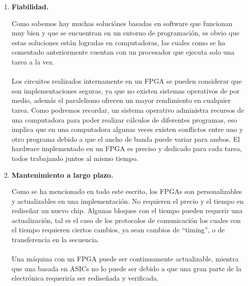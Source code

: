 \documentclass[twoside,spanish,ESP,MSc]{plantillaLabUPV}
\theoremstyle{definition}
\newcommand{\f}{FPGA }
\newcommand{\fs}{FPGAs }
\begin{document}
\begin{enumerate}
De primera mano comparar el precio de costo de fabricación de un ASIC contra la de un \f comercial es total mente diferente. Para un ASIC se requieren varios ingenieros tanto para desarrollar la arquitectura interna como su manufactura. Las soluciones basadas en \fs son bastante simples ya que en una primera parte solamente se necesita la ingeniería detrás de la arquitectura del IC, sin tener que gastar aun en la manufactura. Una vez refinado por completo el modelo puede ser manufacturado, esto puede ahorrar bastante en scrap realizado en pruebas. \\\\Los fabricantes de ICs por lo general hacen lo contrario, sin embargo la fuerte inversión inicial es justificable al manufacturar miles de chips que se venden por año. Por otra parte si solo se necesitan algunos cuantos ICs de un solo tipo un \f puede resultar en una solución abismalmente más barata.\\


\item \textbf{Fiabilidad.}

Como sabemos hay muchas soluciónes basadas en software que funcionan muy bien y que se encuentran en un entorno de programación, es obvio que estas soluciones están logradas en computadoras, las cuales como se ha comentado anteriormente cuentan con un procesador que ejecuta solo una tarea a la vez. \\\\
Los circuitos realizados internamente en un \f se pueden considerar que son implementaciones seguras, ya que no existen sistemas operativos de por medio, además el paralelismo ofrecen un mayor rendimiento en cualquier tarea. Como podremos recordar, un sistema operativo administra recursos de una computadora para poder realizar cálculos de diferentes programas, eso implica que en una computadora algunas veces existen conflictos entre uno y otro programa debido a que el ancho de banda puede variar para ambos. El hardware implementado en un \f es preciso y dedicado para cada tarea, todos trabajando juntos al mismo tiempo. \\

\item \textbf{Mantenimiento a largo plazo.}

Como se ha mencionado en todo este escrito, los \fs son personalizables y actualizables en una implementación. No requieren el precio y el tiempo en rediseñar un nuevo chip. Algunas bloques con el tiempo pueden requerir una actualización, tal es el caso de los protocolos de comunicación los cuales con el tiempo requieren ciertos cambios, ya sean cambios de ``timing'', o de transferencia en la secuencia. \\\\Una máquina con un FPGA puede ser continuamente actualizable, mientra que una basada en ASICs no lo puede ser debido a que una gran parte de la electrónica requeriría ser rediseñada y verificada. 


\end{enumerate}
\end{document}

